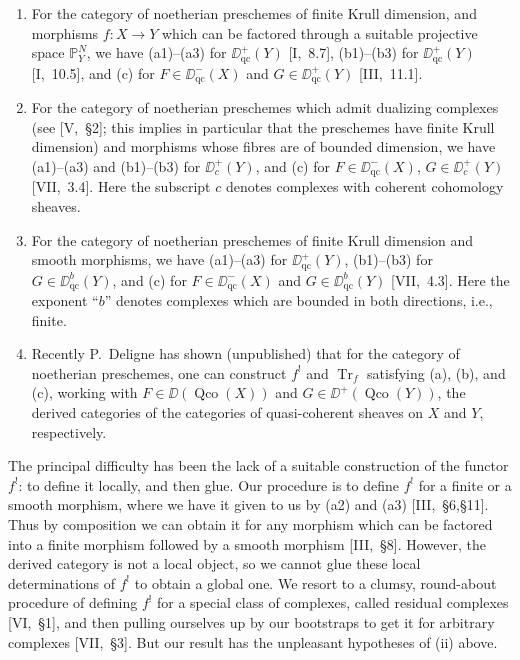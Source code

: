 \begin{enumerate}
	\item[(i)] For the category of noetherian preschemes of finite Krull dimension, and morphisms $f\colon X\to Y$ which can be factored through a suitable projective space $\mathbb{P}_{Y}^{N}$, we have (a1)--(a3) for $\DD_{\mathrm{qc}}^{+}(Y)$ [I,~8.7], (b1)--(b3) for $\DD_{\mathrm{qc}}^{+}(Y)$ [I,~10.5], and (c) for $F\in \DD_{\mathrm{qc}}^{-}(X)$ and $G\in \DD_{\mathrm{qc}}^{+}(Y)$ [III,~11.1].
	
	\item[(ii)] For the category of noetherian preschemes which admit dualizing complexes (see [V,~\S2]; this implies in particular that the preschemes have finite Krull dimension) and morphisms whose fibres are of bounded dimension, we have (a1)--(a3) and (b1)--(b3) for $\DD_{c}^{+}(Y)$, and (c) for $F\in \DD_{\mathrm{qc}}^{-}(X)$, $G\in \DD_{c}^{+}(Y)$ [VII,~3.4]. Here the subscript $c$ denotes complexes with coherent cohomology sheaves.
	
	\item[(iii)] For the category of noetherian preschemes of finite Krull dimension and smooth morphisms, we have (a1)--(a3) for $\DD_{\mathrm{qc}}^{+}(Y)$, (b1)--(b3) for $G\in \DD_{\mathrm{qc}}^{b}(Y)$, and (c) for $F\in \DD_{\mathrm{qc}}^{-}(X)$ and $G\in \DD_{\mathrm{qc}}^{b}(Y)$ [VII,~4.3]. Here the exponent ``$b$'' denotes complexes which are bounded in both directions, i.e., finite.
	
	\item[(iv)] Recently P.~Deligne has shown (unpublished) that for the category of noetherian preschemes, one can construct $f^{!}$ and $\operatorname{Tr}_{f}$ satisfying (a), (b), and (c), working with $F\in \DD(\operatorname{Qco}(X))$ and $G\in \DD^{+}(\operatorname{Qco}(Y))$, the derived categories of the categories of quasi-coherent sheaves on $X$ and $Y$, respectively.
\end{enumerate}

The principal difficulty has been the lack of a suitable construction of the functor $f^{!}$: to define it locally, and then glue. Our procedure is to define $f^{!}$ for a finite or a smooth morphism, where we have it given to us by (a2) and (a3) [III,~\S6,\S11]. Thus by composition we can obtain it for any morphism which can be factored into a finite morphism followed by a smooth morphism [III,~\S8]. However, the derived category is not a local object, so we cannot glue these local determinations of $f^{!}$ to obtain a global one. We resort to a clumsy, round-about procedure of defining $f^{!}$ for a special class of complexes, called residual complexes [VI,~\S1], and then pulling ourselves up by our bootstraps to get it for arbitrary complexes [VII,~\S3]. But our result has the unpleasant hypotheses of (ii) above.

